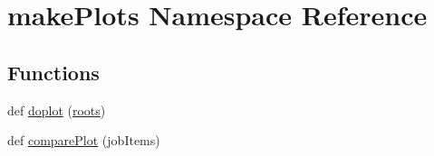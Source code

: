 \hypertarget{namespacemakePlots}{}\section{make\+Plots Namespace Reference}
\label{namespacemakePlots}
\subsection*{Functions}
\begin{DoxyCompactItemize}
\item 
def \mbox{\hyperlink{namespacemakePlots_a34cc3a765a66641e1e3c206e53215a8f}{doplot}} (\mbox{\hyperlink{namespacemakePlots_aa535eb36e332d0cec6f90fa308a42c52}{roots}})
\item 
def \mbox{\hyperlink{namespacemakePlots_abb2409cda5200ce8d8bdd4ef76a8a2cd}{compare\+Plot}} (job\+Items)
\end{DoxyCompactItemize}
